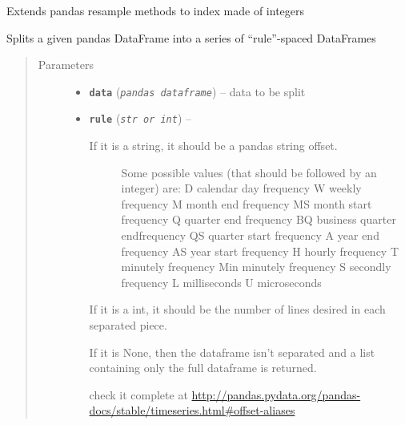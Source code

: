 \documentclass[a4paper,10pt,oneside]{sphinxmanual}
\begin{document}

\begin{fulllineitems}
\label{pymicra.algs:pymicra.algs.general.resample}
Extends pandas resample methods to index made of integers

\end{fulllineitems}


\begin{fulllineitems}
\label{pymicra.algs:pymicra.algs.general.splitData}
Splits a given pandas DataFrame into a series of ``rule''-spaced DataFrames
\begin{quote}\begin{description}
\item[{Parameters}] \leavevmode\begin{itemize}
\item {} 
\textbf{\texttt{data}} (\emph{\texttt{pandas dataframe}}) -- data to be split

\item {} 
\textbf{\texttt{rule}} (\emph{\texttt{str or int}}) -- \begin{description}
\item[{If it is a string, it should be a pandas string offset.}] \leavevmode
Some possible values (that should be followed by an integer) are:
D   calendar day frequency
W   weekly frequency
M   month end frequency
MS  month start frequency
Q   quarter end frequency
BQ  business quarter endfrequency
QS  quarter start frequency
A   year end frequency
AS  year start frequency
H   hourly frequency
T   minutely frequency
Min minutely frequency
S   secondly frequency
L   milliseconds
U   microseconds

\end{description}

If it is a int, it should be the number of lines desired in each separated piece.

If it is None, then the dataframe isn't separated and a list containing only the
full dataframe is returned.

check it complete at \url{http://pandas.pydata.org/pandas-docs/stable/timeseries.html\#offset-aliases}


\end{itemize}

\end{description}\end{quote}

\end{fulllineitems}
\end{document}
